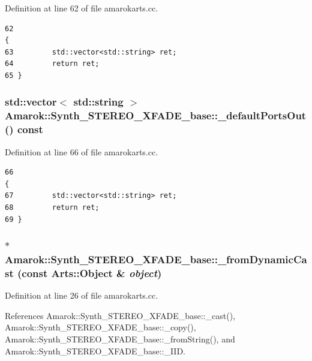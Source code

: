 Definition at line 62 of file amarokarts.cc.



\footnotesize\begin{verbatim}62                                                                           {
63         std::vector<std::string> ret;
64         return ret;
65 }
\end{verbatim}\normalsize 
{}
\subsubsection{\setlength{\rightskip}{0pt plus 5cm}std::vector$<$ std::string $>$ Amarok::Synth\_\-STEREO\_\-XFADE\_\-base::\_\-default\-Ports\-Out () const\hspace{0.3cm}{\tt  [virtual, inherited]}}\label{classAmarok_1_1Synth__STEREO__XFADE__base_Amarok_1_1Synth__STEREO__XFADE__stuba5}




Definition at line 66 of file amarokarts.cc.



\footnotesize\begin{verbatim}66                                                                            {
67         std::vector<std::string> ret;
68         return ret;
69 }
\end{verbatim}\normalsize 
{}
\subsubsection{ $\ast$ Amarok::Synth\_\-STEREO\_\-XFADE\_\-base::\_\-from\-Dynamic\-Cast (const Arts::Object \& {\em object})\hspace{0.3cm}{\tt  [static, inherited]}}\label{classAmarok_1_1Synth__STEREO__XFADE__base_Amarok_1_1Synth__STEREO__XFADE__stube3}




Definition at line 26 of file amarokarts.cc.

References Amarok::Synth\_\-STEREO\_\-XFADE\_\-base::\_\-cast(), Amarok::Synth\_\-STEREO\_\-XFADE\_\-base::\_\-copy(), Amarok::Synth\_\-STEREO\_\-XFADE\_\-base::\_\-from\-String(), and Amarok::Synth\_\-STEREO\_\-XFADE\_\-base::\_\-IID.



